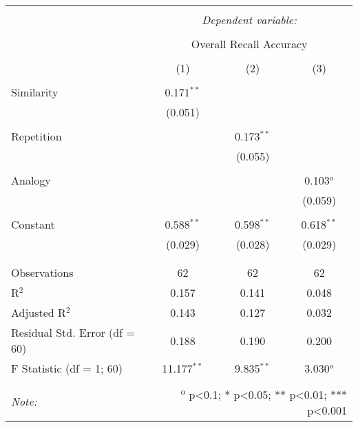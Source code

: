 
\begin{table}[!htbp] \centering
  \caption{}
  \label{table:main}
  \small
  \renewcommand{\arraystretch}{0.6}
\begin{tabular}{@{\extracolsep{5pt}}lccc}
\\[-1.8ex]\hline
\hline \\[-1.8ex]
 & \multicolumn{3}{c}{\textit{Dependent variable:}} \\
\cline{2-4}
\\[-1.8ex] & \multicolumn{3}{c}{Overall Recall Accuracy} \\
\\[-1.8ex] & (1) & (2) & (3)\\
\hline \\[-1.8ex]
 Similarity & 0.171$^{**}$ &  &  \\
  & (0.051) &  &  \\
  & & & \\
 Repetition &  & 0.173$^{**}$ &  \\
  &  & (0.055) &  \\
  & & & \\
 Analogy &  &  & 0.103$^{o}$ \\
  &  &  & (0.059) \\
  & & & \\
 Constant & 0.588$^{**}$ & 0.598$^{**}$ & 0.618$^{**}$ \\
  & (0.029) & (0.028) & (0.029) \\
  & & & \\
\hline \\[-1.8ex]
Observations & 62 & 62 & 62 \\
R$^{2}$ & 0.157 & 0.141 & 0.048 \\
Adjusted R$^{2}$ & 0.143 & 0.127 & 0.032 \\
Residual Std. Error (df = 60) & 0.188 & 0.190 & 0.200 \\
F Statistic (df = 1; 60) & 11.177$^{**}$ & 9.835$^{**}$ & 3.030$^{o}$ \\
\hline
\hline \\[-1.8ex]
\textit{Note:}  & \multicolumn{3}{r}{\textsuperscript{o} p<0.1; * p<0.05; ** p<0.01; *** p<0.001} \\
\end{tabular}
\end{table}
